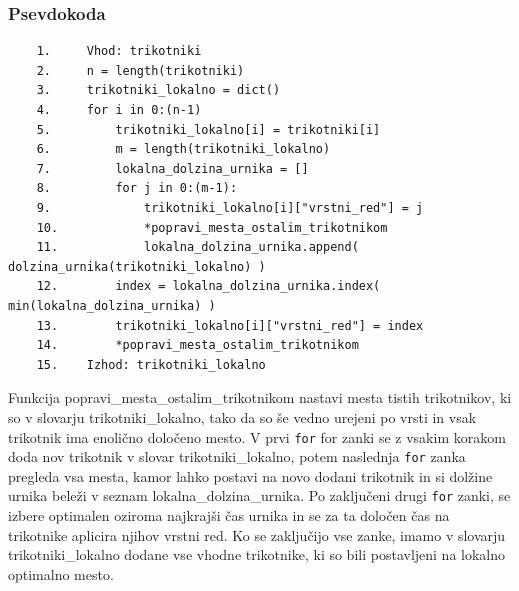 \documentclass[a4paper,12pt]{article}
\theoremstyle{definition}
\theoremstyle{plain}
\begin{document}
\subsubsection{Psevdokoda}
\begin{verbatim}
    1.     Vhod: trikotniki
    2.     n = length(trikotniki)
    3.     trikotniki_lokalno = dict()
    4.     for i in 0:(n-1)
    5.         trikotniki_lokalno[i] = trikotniki[i]
    6.         m = length(trikotniki_lokalno)
    7.         lokalna_dolzina_urnika = []
    8.         for j in 0:(m-1):
    9.             trikotniki_lokalno[i]["vrstni_red"] = j
    10.            *popravi_mesta_ostalim_trikotnikom
    11.            lokalna_dolzina_urnika.append( dolzina_urnika(trikotniki_lokalno) )
    12.        index = lokalna_dolzina_urnika.index( min(lokalna_dolzina_urnika) )
    13.        trikotniki_lokalno[i]["vrstni_red"] = index
    14.        *popravi_mesta_ostalim_trikotnikom
    15.    Izhod: trikotniki_lokalno

\end{verbatim}


Funkcija popravi\_mesta\_ostalim\_trikotnikom nastavi mesta tistih trikotnikov, ki so v slovarju trikotniki\_lokalno, tako da so še vedno urejeni po vrsti in vsak trikotnik ima enolično določeno mesto.
V prvi \texttt{for} for zanki se z vsakim korakom doda nov trikotnik v slovar trikotniki\_lokalno, potem naslednja \texttt{for} zanka pregleda vsa mesta, kamor lahko postavi na novo dodani trikotnik in si dolžine urnika beleži v seznam lokalna\_dolzina\_urnika. Po zaključeni drugi \texttt{for} zanki, se izbere optimalen oziroma najkrajši čas urnika in se za ta določen čas na trikotnike aplicira njihov vrstni red.
Ko se zaključijo vse zanke, imamo v slovarju trikotniki\_lokalno dodane vse vhodne trikotnike, ki so bili postavljeni na lokalno optimalno mesto.


\end{document}

